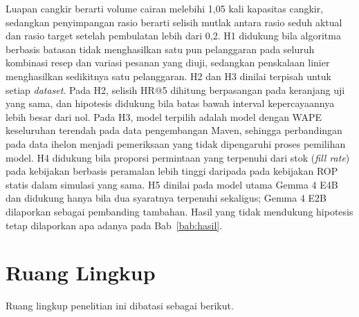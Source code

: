 Luapan cangkir berarti volume cairan melebihi 1,05 kali kapasitas cangkir, sedangkan penyimpangan rasio berarti selisih mutlak antara rasio seduh aktual dan rasio target setelah pembulatan lebih dari 0,2. H1 didukung bila algoritma berbasis batasan tidak menghasilkan satu pun pelanggaran pada seluruh kombinasi resep dan variasi pesanan yang diuji, sedangkan penskalaan linier menghasilkan sedikitnya satu pelanggaran. H2 dan H3 dinilai terpisah untuk setiap \textit{dataset}. Pada H2, selisih HR@5 dihitung berpasangan pada keranjang uji yang sama, dan hipotesis didukung bila batas bawah interval kepercayaannya lebih besar dari nol. Pada H3, model terpilih adalah model dengan WAPE keseluruhan terendah pada data pengembangan Maven, sehingga perbandingan pada data ihelon menjadi pemeriksaan yang tidak dipengaruhi proses pemilihan model. H4 didukung bila proporsi permintaan yang terpenuhi dari stok (\textit{fill rate}) pada kebijakan berbasis peramalan lebih tinggi daripada pada kebijakan ROP statis dalam simulasi yang sama. H5 dinilai pada model utama Gemma 4 E4B dan didukung hanya bila dua syaratnya terpenuhi sekaligus; Gemma 4 E2B dilaporkan sebagai pembanding tambahan. Hasil yang tidak mendukung hipotesis tetap dilaporkan apa adanya pada Bab~\ref{bab:hasil}.

\section{Ruang Lingkup}
\label{sec:ruang-lingkup}

Ruang lingkup penelitian ini dibatasi sebagai berikut.


